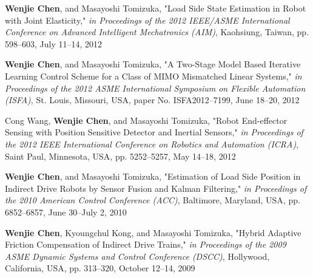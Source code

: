 \documentclass{res}
\begin{document}
\begin{resume}
\begin{etaremune}[start=20]
    \item \textbf{Wenjie Chen}, and Masayoshi Tomizuka, "Load Side State Estimation in Robot with Joint Elasticity," \emph{in Proceedings of the 2012 IEEE/ASME International Conference on Advanced Intelligent Mechatronics (AIM)}, Kaohsiung, Taiwan, pp. 598--603, July 11--14, 2012
    \item \textbf{Wenjie Chen}, and Masayoshi Tomizuka, "A Two-Stage Model Based Iterative Learning Control Scheme for a Class of MIMO Mismatched Linear Systems," \emph{in Proceedings of the 2012 ASME International Symposium on Flexible Automation (ISFA)}, St. Louis, Missouri, USA, paper No. ISFA2012--7199, June 18--20, 2012
    \item Cong Wang, \textbf{Wenjie Chen}, and Masayoshi Tomizuka, "Robot End-effector Sensing with Position Sensitive Detector and Inertial Sensors," \emph{in Proceedings of the 2012 IEEE International Conference on Robotics and Automation (ICRA)}, Saint Paul, Minnesota, USA, pp. 5252--5257, May 14--18, 2012
    \item \textbf{Wenjie Chen}, and Masayoshi Tomizuka, "Estimation of Load Side Position in Indirect Drive Robots by Sensor Fusion and Kalman Filtering," \emph{in Proceedings of the 2010 American Control Conference (ACC)}, Baltimore, Maryland, USA, pp. 6852--6857, June 30--July 2, 2010
    \item \textbf{Wenjie Chen}, Kyoungchul Kong, and Masayoshi Tomizuka, "Hybrid Adaptive Friction Compensation of Indirect Drive Trains," \emph{in Proceedings of the 2009 ASME Dynamic Systems and Control Conference (DSCC)}, Hollywood, California, USA, pp. 313--320, October 12--14, 2009
    \end{etaremune}


\end{resume}
\end{document}
